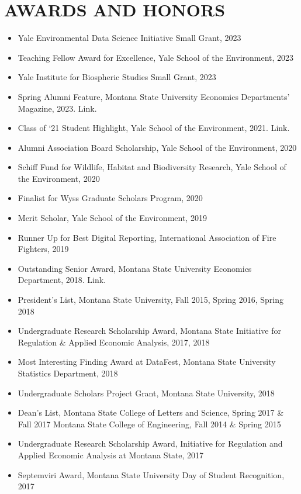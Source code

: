 \documentclass[11pt]{article}
\begin{document}
\section*{AWARDS AND HONORS}
\begin{itemize}[left=0pt]
    \item Yale Environmental Data Science Initiative Small Grant, 2023
    \item Teaching Fellow Award for Excellence, Yale School of the Environment, 2023
    \item Yale Institute for Biospheric Studies Small Grant, 2023
    \item Spring Alumni Feature, Montana State University Economics Departments’ Magazine, 2023. Link.
    \item Class of ‘21 Student Highlight, Yale School of the Environment, 2021. Link.
    \item Alumni Association Board Scholarship, Yale School of the Environment, 2020
    \item Schiff Fund for Wildlife, Habitat and Biodiversity Research, Yale School of the Environment, 2020
    \item Finalist for Wyss Graduate Scholars Program, 2020
    \item Merit Scholar, Yale School of the Environment, 2019
    \item Runner Up for Best Digital Reporting, International Association of Fire Fighters, 2019
    \item Outstanding Senior Award, Montana State University Economics Department, 2018. Link.
    \item President’s List, Montana State University, Fall 2015, Spring 2016, Spring 2018
    \item Undergraduate Research Scholarship Award, Montana State Initiative for Regulation \& Applied Economic Analysis, 2017, 2018
    \item Most Interesting Finding Award at DataFest, Montana State University Statistics Department, 2018
    \item Undergraduate Scholars Project Grant, Montana State University, 2018
    \item Dean’s List, Montana State College of Letters and Science, Spring 2017 \& Fall 2017 Montana State College of Engineering, Fall 2014 \& Spring 2015
    \item Undergraduate Research Scholarship Award, Initiative for Regulation and Applied Economic Analysis at Montana State, 2017
    \item Septemviri Award, Montana State University Day of Student Recognition, 2017

\end{itemize}
\end{document}

